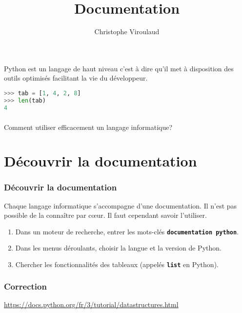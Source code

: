 \documentclass[svgnames,11pt]{beamer}
\author[]{Christophe Viroulaud}
\title{Documentation}
\date{\framebox{\textbf{DonRep 10}}}
\institute{Première - NSI}
\begin{document}
\begin{frame}
\titlepage
\end{frame}
\begin{frame}[fragile]
    \frametitle{}

    Python est un langage de haut niveau c'est à dire qu'il met à disposition des outils optimisés facilitant la vie du développeur. 
    \begin{center}
    \begin{lstlisting}[language=Python , basicstyle=\ttfamily\small, xleftmargin=2em, xrightmargin=2em]
>>> tab = [1, 4, 2, 8]
>>> len(tab)
4
\end{lstlisting}
    \label{CODE}
    \end{center}

\end{frame}
\begin{frame}
    \frametitle{}

    \begin{framed}
        \centering Comment utiliser efficacement un langage informatique?
    \end{framed}

\end{frame}
\section{Découvrir la documentation}
\begin{frame}
    \frametitle{Découvrir la documentation}
\begin{aretenir}[]
Chaque langage informatique s'accompagne d'une documentation. Il n'est pas possible de la connaître par cœur. Il faut cependant savoir l'utiliser.
\end{aretenir}
\begin{activite}
\begin{enumerate}
    \item Dans un moteur de recherche, entrer les mots-clés \textbf{\texttt{documentation python}}.
    \item Dans les menus déroulants, choisir la langue et la version de Python.
    \item Chercher les fonctionnalités des tableaux (appelés \textbf{\texttt{list}} en Python).
\end{enumerate}
\end{activite}
    

\end{frame}
\begin{frame}
    \frametitle{Correction}

    \begin{center}
        \url{https://docs.python.org/fr/3/tutorial/datastructures.html}
        \end{center}

\end{frame}
\end{document}
